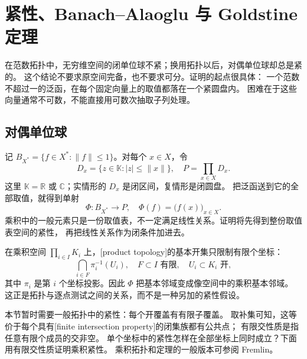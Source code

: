 \section{\WeakStar{}紧性、Banach--Alaoglu 与 Goldstine 定理}
\label{b1:sec:0903}

在范数拓扑中，无穷维空间的闭单位球不紧；换用\WeakStar{}拓扑以后，对偶单位球却总是紧的。
这个结论不要求原空间完备，也不要求可分。证明的起点很具体：
一个范数不超过一的泛函，在每个固定向量上的取值都落在一个紧圆盘内。
困难在于这些向量通常不可数，不能直接用可数次抽取子列处理。

\subsection{对偶单位球}
\label{b1:subsec:090301}

记 \(B_{X^*}=\{f\in X^*:\|f\|\leq1\}\)。对每个 \(x\in X\)，令
\[
 D_x=\{z\in\mathbb K:|z|\leq\|x\|\},
 \quad P=\prod_{x\in X}D_x.
\]
这里 \(\mathbb K=\mathbb R\) 或 \(\mathbb C\)；实情形的 \(D_x\) 是闭区间，复情形是闭圆盘。
把泛函送到它的全部取值，就得到单射
\[
 \Phi:B_{X^*}\longrightarrow P,
 \quad \Phi(f)=\bigl(f(x)\bigr)_{x\in X}.
\]
乘积中的一般元素只是一份取值表，不一定满足线性关系。证明将先得到整份取值表空间的紧性，
再把线性关系作为闭条件加进去。

\ProseParagraphBreak

在乘积空间 \(\prod_{i\in I}K_i\) 上，[product topology]的基本开集只限制有限个坐标：
\[
 \bigcap_{i\in F}\pi_i^{-1}(U_i),
 \quad F\subset I\text{ 有限},\quad U_i\subset K_i\text{ 开},
\]
其中 \(\pi_i\) 是第 \(i\) 个坐标投影。因此 \(\Phi\) 把\WeakStar{}基本邻域变成像空间中的乘积基本邻域。
这正是\WeakStar{}拓扑与逐点测试之间的关系，而不是一种另加的紧性假设。

\ProseParagraphBreak

本节暂时需要一般拓扑中的紧性：每个开覆盖有有限子覆盖。
取补集可知，这等价于每个具有[finite intersection property]的闭集族都有公共点；
有限交性质是指任意有限个成员的交非空。
单个坐标中的紧性怎样在全部坐标上同时成立？下面用有限交性质证明乘积紧性。
乘积拓扑和定理的一般版本可参阅 Fremlin\cite[Volume 3, 3A3I--J]{Fremlin2016Measure}。

